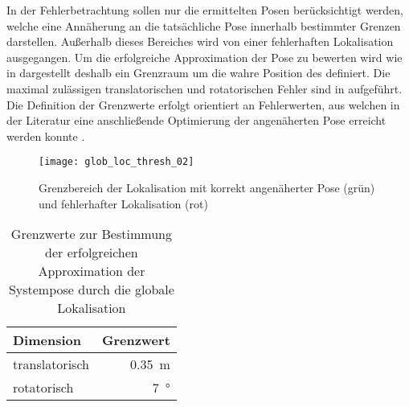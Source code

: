 

In der Fehlerbetrachtung sollen nur die ermittelten Posen berücksichtigt werden, welche eine Annäherung an die tatsächliche Pose innerhalb bestimmter Grenzen darstellen. Außerhalb dieses Bereiches wird von einer fehlerhaften Lokalisation ausgegangen. Um die erfolgreiche Approximation der Pose zu bewerten wird wie in  dargestellt deshalb ein Grenzraum um die wahre Position des  definiert. Die maximal zulässigen translatorischen und rotatorischen Fehler sind in  aufgeführt. Die Definition der Grenzwerte erfolgt orientiert an Fehlerwerten, aus welchen in der Literatur eine anschließende Optimierung der angenäherten Pose erreicht werden konnte \cite{Forster2013}.\\

\begin{figure}[!ht]
	\begin{center}
		\texttt{[image: glob\_loc\_thresh\_02]}
		\caption{Grenzbereich der Lokalisation mit korrekt angenäherter Pose (grün) und fehlerhafter Lokalisation (rot)}
		\label{fig.loclimits}
	\end{center}
\end{figure}


\begin{table}[ht]
\begin{center}
\setlength{\tabcolsep}{18pt}
	\begin{tabular}[ht]{lr}
	\toprule
	Dimension		& Grenzwert 					\\ 
	\midrule 
	translatorisch  	& \SI{0,35}{\meter}			\\ \addlinespace
	rotatorisch		& \SI{7}{°}					\\ 
	\bottomrule
	\end{tabular} 
	\caption{Grenzwerte zur Bestimmung der erfolgreichen Approximation der Systempose durch die globale Lokalisation}
\label{tab.thresh_glob}
\end{center}
\end{table}

